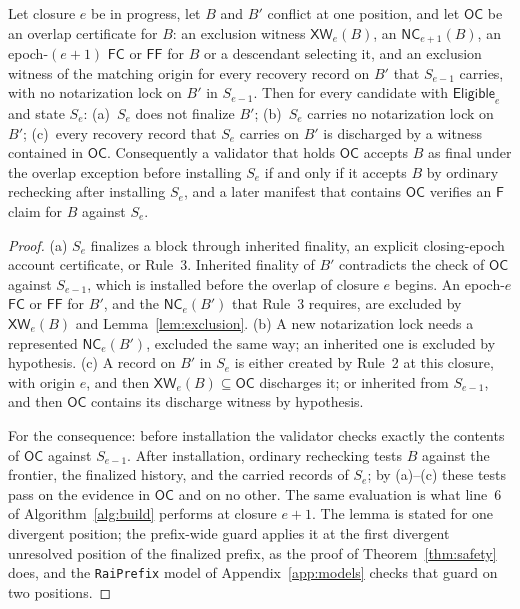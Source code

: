 \documentclass[conference]{IEEEtran}
\newcommand{\NC}{\mathsf{NC}}
\newcommand{\XW}{\mathsf{XW}}
\newcommand{\OC}{\mathsf{OC}}
\newcommand{\FC}{\mathsf{FC}}
\newcommand{\FF}{\mathsf{FF}}
\newcommand{\Elig}{\mathsf{Eligible}}
\newcommand{\tagF}{\mathsf{F}}
\begin{document}
\begin{lemma}
\label{lem:verdict}
Let closure $e$ be in progress, let $B$ and $B'$ conflict at one position, and let $\OC$ be an overlap certificate for $B$: an exclusion witness $\XW_e(B)$, an $\NC_{e+1}(B)$, an epoch-$(e+1)$ $\FC$ or $\FF$ for $B$ or a descendant selecting it, and an exclusion witness of the matching origin for every recovery record on $B'$ that $S_{e-1}$ carries, with no notarization lock on $B'$ in $S_{e-1}$. Then for every candidate with $\Elig_e$ and state $S_e$: (a)~$S_e$ does not finalize $B'$; (b)~$S_e$ carries no notarization lock on $B'$; (c)~every recovery record that $S_e$ carries on $B'$ is discharged by a witness contained in $\OC$. Consequently a validator that holds $\OC$ accepts $B$ as final under the overlap exception before installing $S_e$ if and only if it accepts $B$ by ordinary rechecking after installing $S_e$, and a later manifest that contains $\OC$ verifies an $\tagF$ claim for $B$ against $S_e$.
\end{lemma}
\begin{proof}
(a) $S_e$ finalizes a block through inherited finality, an explicit closing-epoch account certificate, or Rule~3. Inherited finality of $B'$ contradicts the check of $\OC$ against $S_{e-1}$, which is installed before the overlap of closure $e$ begins. An epoch-$e$ $\FC$ or $\FF$ for $B'$, and the $\NC_e(B')$ that Rule~3 requires, are excluded by $\XW_e(B)$ and Lemma~\ref{lem:exclusion}. (b) A new notarization lock needs a represented $\NC_e(B')$, excluded the same way; an inherited one is excluded by hypothesis. (c) A record on $B'$ in $S_e$ is either created by Rule~2 at this closure, with origin $e$, and then $\XW_e(B)\subseteq\OC$ discharges it; or inherited from $S_{e-1}$, and then $\OC$ contains its discharge witness by hypothesis.

For the consequence: before installation the validator checks exactly the contents of $\OC$ against $S_{e-1}$. After installation, ordinary rechecking tests $B$ against the frontier, the finalized history, and the carried records of $S_e$; by (a)--(c) these tests pass on the evidence in $\OC$ and on no other. The same evaluation is what line~6 of Algorithm~\ref{alg:build} performs at closure $e+1$. The lemma is stated for one divergent position; the prefix-wide guard applies it at the first divergent unresolved position of the finalized prefix, as the proof of Theorem~\ref{thm:safety} does, and the \texttt{RaiPrefix} model of Appendix~\ref{app:models} checks that guard on two positions.
\end{proof}
\end{document}
